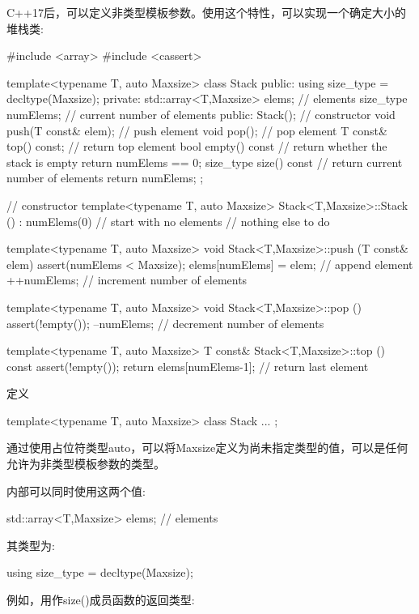 C++17后，可以定义非类型模板参数。使用这个特性，可以实现一个确定大小的堆栈类:

\begin{cpp}
#include <array>
#include <cassert>

template<typename T, auto Maxsize>
class Stack {
	public:
	using size_type = decltype(Maxsize);
private:
	std::array<T,Maxsize> elems; // elements
	size_type numElems; // current number of elements
public:
	Stack(); // constructor
	void push(T const& elem); // push element
	void pop(); // pop element
	T const& top() const; // return top element
	bool empty() const { // return whether the stack is empty
		return numElems == 0;
	}
	size_type size() const { // return current number of elements
		return numElems;
	}
};

// constructor
template<typename T, auto Maxsize>
Stack<T,Maxsize>::Stack ()
: numElems(0) // start with no elements
{
	// nothing else to do
}

template<typename T, auto Maxsize>
void Stack<T,Maxsize>::push (T const& elem)
{
	assert(numElems < Maxsize);
	elems[numElems] = elem; // append element
	++numElems; // increment number of elements
}

template<typename T, auto Maxsize>
void Stack<T,Maxsize>::pop ()
{
	assert(!empty());
	--numElems; // decrement number of elements
}

template<typename T, auto Maxsize>
T const& Stack<T,Maxsize>::top () const
{
	assert(!empty());
	return elems[numElems-1]; // return last element
}
\end{cpp}

定义

\begin{cpp}
template<typename T, auto Maxsize>
class Stack {
	...
};
\end{cpp}

通过使用占位符类型auto，可以将Maxsize定义为尚未指定类型的值，可以是任何允许为非类型模板参数的类型。

内部可以同时使用这两个值:

\begin{cpp}
std::array<T,Maxsize> elems; // elements
\end{cpp}

其类型为:

\begin{cpp}
using size_type = decltype(Maxsize);
\end{cpp}

例如，用作size()成员函数的返回类型:

